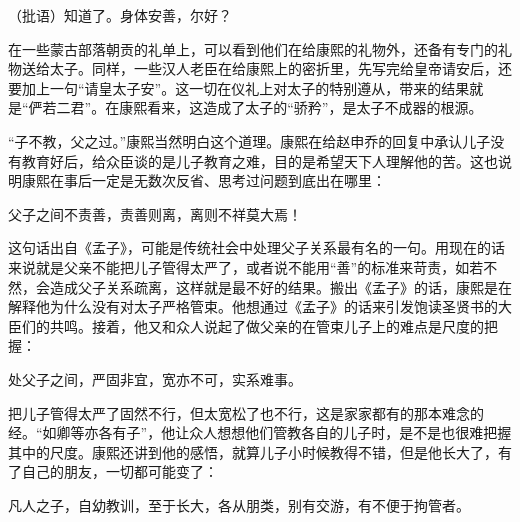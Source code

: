 
\begin{bookquote}（批语）知道了。身体安善，尔好？\end{bookquote}


在一些蒙古部落朝贡的礼单上，可以看到他们在给康熙的礼物外，还备有专门的礼物送给太子。同样，一些汉人老臣在给康熙上的密折里，先写完给皇帝请安后，还要加上一句“请皇太子安”。这一切在仪礼上对太子的特别遵从，带来的结果就是“俨若二君”。在康熙看来，这造成了太子的“骄矜”，是太子不成器的根源。



“子不教，父之过。”康熙当然明白这个道理。康熙在给赵申乔的回复中承认儿子没有教育好后，给众臣谈的是儿子教育之难，目的是希望天下人理解他的苦。这也说明康熙在事后一定是无数次反省、思考过问题到底出在哪里：



\begin{bookquote}父子之间不责善，责善则离，离则不祥莫大焉！\end{bookquote}


这句话出自《孟子》，可能是传统社会中处理父子关系最有名的一句。用现在的话来说就是父亲不能把儿子管得太严了，或者说不能用“善”的标准来苛责，如若不然，会造成父子关系疏离，这样就是最不好的结果。搬出《孟子》的话，康熙是在解释他为什么没有对太子严格管束。他想通过《孟子》的话来引发饱读圣贤书的大臣们的共鸣。接着，他又和众人说起了做父亲的在管束儿子上的难点是尺度的把握：



\begin{bookquote}处父子之间，严固非宜，宽亦不可，实系难事。\end{bookquote}


把儿子管得太严了固然不行，但太宽松了也不行，这是家家都有的那本难念的经。“如卿等亦各有子”，他让众人想想他们管教各自的儿子时，是不是也很难把握其中的尺度。康熙还讲到他的感悟，就算儿子小时候教得不错，但是他长大了，有了自己的朋友，一切都可能变了：



\begin{bookquote}凡人之子，自幼教训，至于长大，各从朋类，别有交游，有不便于拘管者。\end{bookquote}


